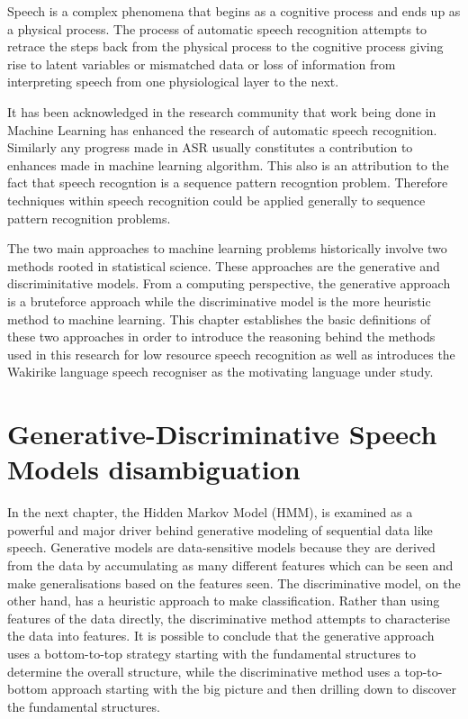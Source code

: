 Speech is a complex phenomena that begins as a cognitive process and ends up as a physical process.  The process of automatic speech recognition attempts to retrace the steps back from the physical process to the cognitive process giving rise to latent variables or mismatched data or loss of information from interpreting speech from one physiological layer to the next.

It has been acknowledged in the research community \citep{2015watanabe,deng2013machine}  that work being done in Machine Learning has enhanced the research of automatic speech recognition.  Similarly any progress made in ASR usually constitutes a contribution to enhances made in machine learning algorithm.  This also is an attribution to the fact that speech recogntion is a sequence pattern recogntion problem.  Therefore techniques within speech recognition could be applied generally to sequence pattern recognition problems.

\iffalse
** TODO Uses of ASR ([[https://www.dropbox.com/s/ly7lwhljsxhuos1/forced_alignment_slides.pdf?dl=0][University of Oxford]]) 
- As a toolbox
- As a methodology
\fi


The two main approaches to machine learning problems historically involve two methods rooted in statistical science.  These approaches are the generative and discriminitative models.  From a computing perspective, the generative approach is a bruteforce approach while the discriminative model is the more heuristic method to machine learning. This chapter establishes the basic definitions of these two approaches in order to introduce the reasoning behind the methods used in this research for low resource speech recognition as well as introduces the Wakirike language speech recogniser as the motivating language under study.

\section{Generative-Discriminative Speech Models disambiguation}
\pagestyle{fancy}
In the next chapter, the Hidden Markov Model (HMM), is examined as a powerful and major driver behind generative modeling of sequential data like speech.  Generative models are data-sensitive models because they are derived from the data by accumulating as many different features which can be seen and make generalisations based on the features seen. The discriminative model, on the other hand, has a heuristic approach to make classification.  Rather than using features of the data directly, the discriminative method attempts to characterise the data into features. It is possible to conclude that the generative approach uses a bottom-to-top strategy starting with the fundamental structures to determine the overall structure, while the discriminative method uses a top-to-bottom approach starting with the big picture and then drilling down to discover the fundamental structures.

